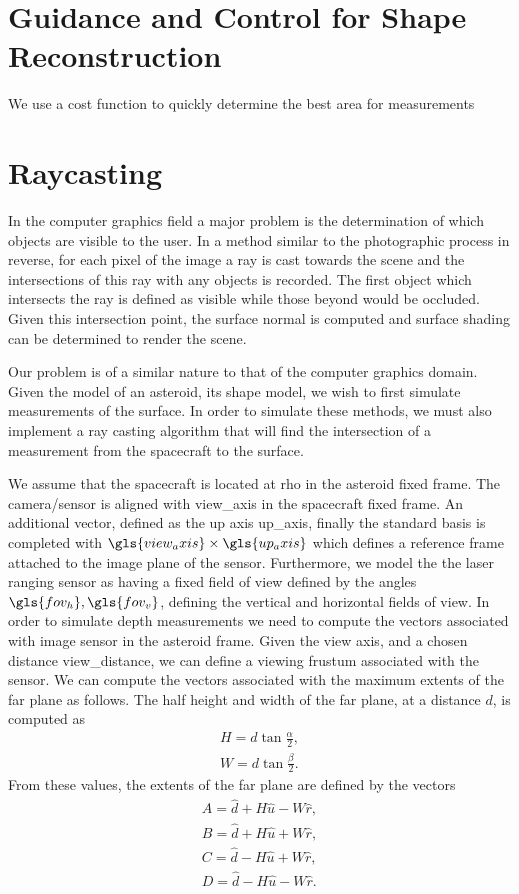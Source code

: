 \section{Guidance and Control for Shape Reconstruction}

We use a cost function to quickly determine the best area for measurements


\section{Raycasting}

In the computer graphics field a major problem is the determination of which objects are visible to the user.
In a method similar to the photographic process in reverse, for each pixel of the image a ray is cast towards the scene and the intersections of this ray with any objects is recorded.
The first object which intersects the ray is defined as visible while those beyond would be occluded.
Given this intersection point, the surface normal is computed and surface shading can be determined to render the scene.

Our problem is of a similar nature to that of the computer graphics domain.
Given the model of an asteroid, its shape model, we wish to first simulate measurements of the surface. 
In order to simulate these methods, we must also implement a ray casting algorithm that will find the intersection of a measurement from the spacecraft to the surface. 

We assume that the spacecraft is located at \gls{rho} in the asteroid fixed frame.
The camera/sensor is aligned with \gls{view_axis} in the spacecraft fixed frame.
An additional vector, defined as the up axis \gls{up_axis}, finally the standard basis is completed with \( \gls{view_axis} \times \gls{up_axis} \) which defines a reference frame attached to the image plane of the sensor.
Furthermore, we model the the laser ranging sensor as having a fixed field of view defined by the angles \( \gls{fov_h}, \gls{fov_v}\), defining the vertical and horizontal fields of view.
In order to simulate depth measurements we need to compute the vectors associated with image sensor in the asteroid frame. 
Given the view axis, and a chosen distance \gls{view_distance}, we can define a viewing \gls{frustum} associated with the sensor. 
We can compute the vectors associated with the maximum extents of the far plane as follows.
The half height and width of the far plane, at a distance \( d \), is computed as
\begin{align}
    H = d \tan \frac{\alpha}{2} , \\
    W = d \tan \frac{\beta}{2} .
\end{align}
From these values, the extents of the far plane are defined by the vectors
\begin{align}
    A = \hat d + H \hat u - W \hat r , \\
    B = \hat d + H \hat u + W \hat r, \\
    C = \hat d - H \hat  u + W \hat r, \\
    D = \hat d - H \hat u - W \hat r.
\end{align}

